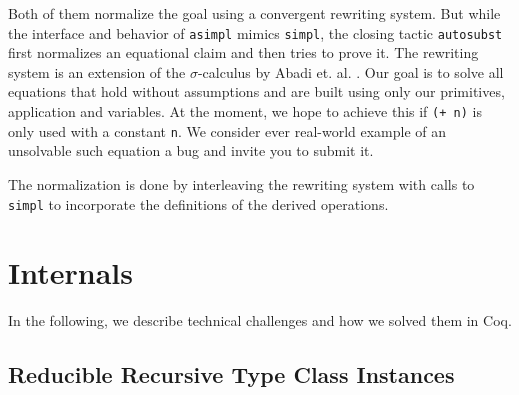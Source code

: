 \documentclass{scrartcl}
\newcommand{\lst}{\lstinline}
\begin{document}
Both of them normalize the goal using a convergent rewriting system.
But while the interface and behavior of \lst$asimpl$ mimics \lst$simpl$, the closing tactic \lst$autosubst$ first normalizes an equational claim and then tries to prove it.
The rewriting system is an extension of the $\sigma$-calculus by Abadi et. al. \cite{abadi1991}.
Our goal is to solve all equations that hold without assumptions and are built using only our primitives, application and variables. At the moment, we hope to achieve this if \lst$(+ n)$ is only used with a constant \lst$n$. We consider ever real-world example of an unsolvable such equation a bug and invite you to submit it.



The normalization is done by interleaving the rewriting system with calls to \lst$simpl$ to incorporate the definitions of the derived operations. 


\section{Internals}
\label{sec:internals}

In the following, we describe technical challenges and how we solved them in Coq.

\subsection{Reducible Recursive Type Class Instances}
\label{sec:reduc-recurs-inst}
\end{document}
